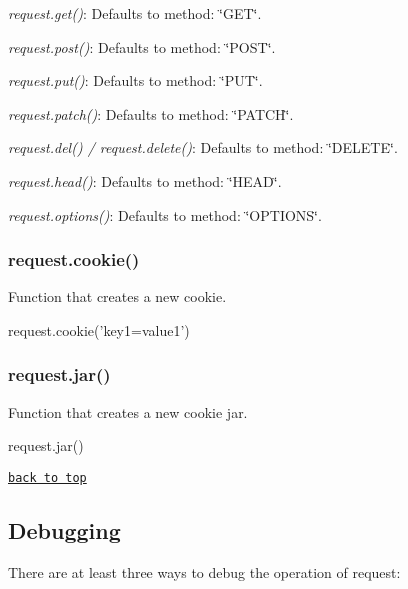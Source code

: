 \begin{DoxyItemize}
\item {\itshape request.\+get()}\+: Defaults to {\ttfamily method\+: \char`\"{}\+G\+E\+T\char`\"{}}.
\item {\itshape request.\+post()}\+: Defaults to {\ttfamily method\+: \char`\"{}\+P\+O\+S\+T\char`\"{}}.
\item {\itshape request.\+put()}\+: Defaults to {\ttfamily method\+: \char`\"{}\+P\+U\+T\char`\"{}}.
\item {\itshape request.\+patch()}\+: Defaults to {\ttfamily method\+: \char`\"{}\+P\+A\+T\+C\+H\char`\"{}}.
\item {\itshape request.\+del() / request.\+delete()}\+: Defaults to {\ttfamily method\+: \char`\"{}\+D\+E\+L\+E\+T\+E\char`\"{}}.
\item {\itshape request.\+head()}\+: Defaults to {\ttfamily method\+: \char`\"{}\+H\+E\+A\+D\char`\"{}}.
\item {\itshape request.\+options()}\+: Defaults to {\ttfamily method\+: \char`\"{}\+O\+P\+T\+I\+O\+N\+S\char`\"{}}.
\end{DoxyItemize}

\subsubsection*{request.\+cookie()}

Function that creates a new cookie.


\begin{DoxyCode}
request.cookie('key1=value1')
\end{DoxyCode}
 \subsubsection*{request.\+jar()}

Function that creates a new cookie jar.


\begin{DoxyCode}
request.jar()
\end{DoxyCode}


\href{#table-of-contents}{\tt back to top}





\subsection*{Debugging}

There are at least three ways to debug the operation of {\ttfamily request}\+:


